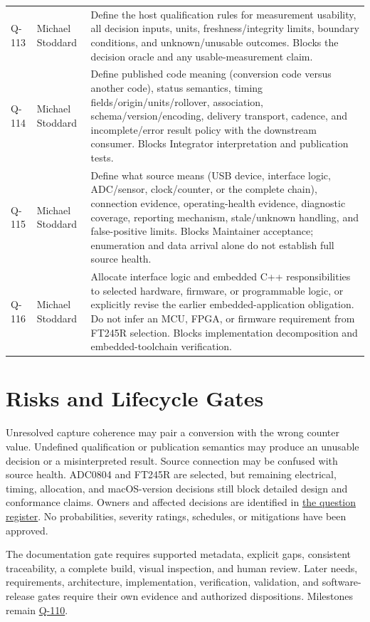 \begin{tabularx}{\linewidth}{L{1.3cm}L{3.1cm}Y}
\label{Question:Q-113}Q-113 & Michael Stoddard & Define the host qualification rules for measurement usability, all decision inputs, units, freshness/integrity limits, boundary conditions, and unknown/unusable outcomes. Blocks the decision oracle and any usable-measurement claim.\\
\label{Question:Q-114}Q-114 & Michael Stoddard & Define published code meaning (conversion code versus another code), status semantics, timing fields/origin/units/rollover, association, schema/version/encoding, delivery transport, cadence, and incomplete/error result policy with the downstream consumer. Blocks Integrator interpretation and publication tests.\\
\label{Question:Q-115}Q-115 & Michael Stoddard & Define what source means (USB device, interface logic, ADC/sensor, clock/counter, or the complete chain), connection evidence, operating-health evidence, diagnostic coverage, reporting mechanism, stale/unknown handling, and false-positive limits. Blocks Maintainer acceptance; enumeration and data arrival alone do not establish full source health.\\
\label{Question:Q-116}Q-116 & Michael Stoddard & Allocate interface logic and embedded C++ responsibilities to selected hardware, firmware, or programmable logic, or explicitly revise the earlier embedded-application obligation. Do not infer an MCU, FPGA, or firmware requirement from FT245R selection. Blocks implementation decomposition and embedded-toolchain verification.\\
\end{tabularx}
\normalsize

\section{Risks and Lifecycle Gates}
Unresolved capture coherence may pair a conversion with the wrong counter value. Undefined qualification or publication semantics may produce an unusable decision or a misinterpreted result. Source connection may be confused with source health. ADC0804 and FT245R are selected, but remaining electrical, timing, allocation, and macOS-version decisions still block detailed design and conformance claims. Owners and affected decisions are identified in \hyperref[Table:OwnedQuestions]{the question register}. No probabilities, severity ratings, schedules, or mitigations have been approved.

The documentation gate requires supported metadata, explicit gaps, consistent traceability, a complete build, visual inspection, and human review. Later needs, requirements, architecture, implementation, verification, validation, and software-release gates require their own evidence and authorized dispositions. Milestones remain \hyperref[Question:Q-110]{Q-110}.
